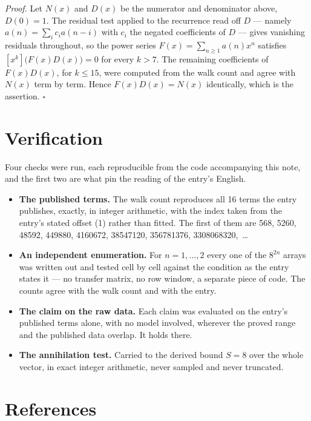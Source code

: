 \documentclass[11pt]{article}
\theoremstyle{definition}
\begin{document}
{\itshape Proof.} Let $N(x)$ and $D(x)$ be the numerator and denominator above, $D(0)=1$. The residual test applied to the recurrence read off $D$ --- namely $a(n) = \sum_i c_i a(n-i)$ with $c_i$ the negated coefficients of $D$ --- gives vanishing residuals throughout, so the power series $F(x)=\sum_{n\ge 1}a(n)x^n$ satisfies $[x^k]\bigl(F(x)D(x)\bigr) = 0$ for every $k > 7$. The remaining coefficients of $F(x)D(x)$, for $k \le 15$, were computed from the walk count and agree with $N(x)$ term by term. Hence $F(x)D(x) = N(x)$ identically, which is the assertion. $\square$

\section{Verification}

Four checks were run, each reproducible from the code accompanying this note, and the first two are what pin the reading of the entry's English.

\begin{itemize}

\item {\bfseries The published terms.} The walk count reproduces all 16 terms the entry publishes, exactly, in integer arithmetic, with the index taken from the entry's stated offset (1) rather than fitted. The first of them are 568, 5260, 48592, 449880, 4160672, 38547120, 356781376, 3308068320,~\dots

\item {\bfseries An independent enumeration.} For $n = 1,\dots,2$ every one of the $8^{2n}$ arrays was written out and tested cell by cell against the condition as the entry states it --- no transfer matrix, no row window, a separate piece of code. The counts agree with the walk count and with the entry.

\item {\bfseries The claim on the raw data.} Each claim was evaluated on the entry's published terms alone, with no model involved, wherever the proved range and the published data overlap. It holds there.

\item {\bfseries The annihilation test.} Carried to the derived bound $S = 8$ over the whole vector, in exact integer arithmetic, never sampled and never truncated.

\end{itemize}

\section{References}
\end{document}
